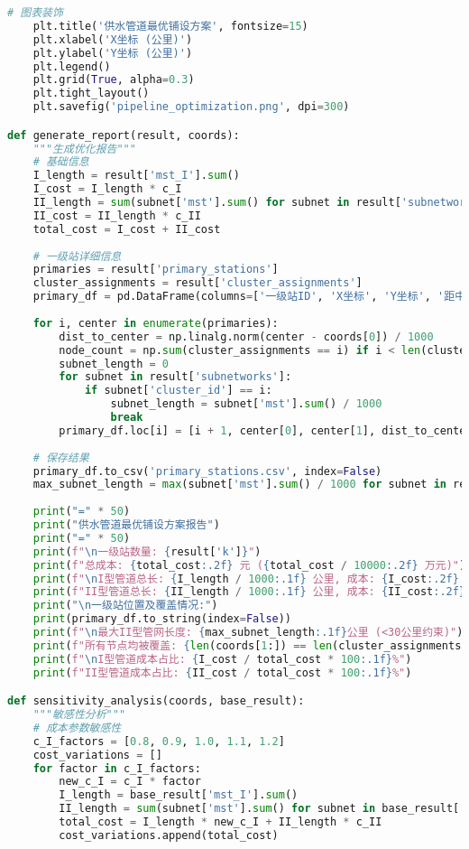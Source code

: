 \documentclass[12pt,a4paper]{article}
\begin{document}
\begin{lstlisting}[language=Python]
    # 图表装饰
    plt.title('供水管道最优铺设方案', fontsize=15)
    plt.xlabel('X坐标 (公里)')
    plt.ylabel('Y坐标 (公里)')
    plt.legend()
    plt.grid(True, alpha=0.3)
    plt.tight_layout()
    plt.savefig('pipeline_optimization.png', dpi=300)

def generate_report(result, coords):
    """生成优化报告"""
    # 基础信息
    I_length = result['mst_I'].sum()
    I_cost = I_length * c_I
    II_length = sum(subnet['mst'].sum() for subnet in result['subnetworks'])
    II_cost = II_length * c_II
    total_cost = I_cost + II_cost
    
    # 一级站详细信息
    primaries = result['primary_stations']
    cluster_assignments = result['cluster_assignments']
    primary_df = pd.DataFrame(columns=['一级站ID', 'X坐标', 'Y坐标', '距中心站距离(公里)', '覆盖节点数', 'II型管网长度(公里)'])
    
    for i, center in enumerate(primaries):
        dist_to_center = np.linalg.norm(center - coords[0]) / 1000
        node_count = np.sum(cluster_assignments == i) if i < len(cluster_assignments) else 0
        subnet_length = 0
        for subnet in result['subnetworks']:
            if subnet['cluster_id'] == i:
                subnet_length = subnet['mst'].sum() / 1000
                break
        primary_df.loc[i] = [i + 1, center[0], center[1], dist_to_center, node_count, subnet_length]
    
    # 保存结果
    primary_df.to_csv('primary_stations.csv', index=False)
    max_subnet_length = max(subnet['mst'].sum() / 1000 for subnet in result['subnetworks'])
    
    print("=" * 50)
    print("供水管道最优铺设方案报告")
    print("=" * 50)
    print(f"\n一级站数量: {result['k']}")
    print(f"总成本: {total_cost:.2f} 元 ({total_cost / 10000:.2f} 万元)")
    print(f"\nI型管道总长: {I_length / 1000:.1f} 公里, 成本: {I_cost:.2f} 元")
    print(f"II型管道总长: {II_length / 1000:.1f} 公里, 成本: {II_cost:.2f} 元")
    print("\n一级站位置及覆盖情况:")
    print(primary_df.to_string(index=False))
    print(f"\n最大II型管网长度: {max_subnet_length:.1f}公里 (<30公里约束)")
    print(f"所有节点均被覆盖: {len(coords[1:]) == len(cluster_assignments)}")
    print(f"\nI型管道成本占比: {I_cost / total_cost * 100:.1f}%")
    print(f"II型管道成本占比: {II_cost / total_cost * 100:.1f}%")

def sensitivity_analysis(coords, base_result):
    """敏感性分析"""
    # 成本参数敏感性
    c_I_factors = [0.8, 0.9, 1.0, 1.1, 1.2]
    cost_variations = []
    for factor in c_I_factors:
        new_c_I = c_I * factor
        I_length = base_result['mst_I'].sum()
        II_length = sum(subnet['mst'].sum() for subnet in base_result['subnetworks'])
        total_cost = I_length * new_c_I + II_length * c_II
        cost_variations.append(total_cost)
    

\end{lstlisting}
\end{document}
